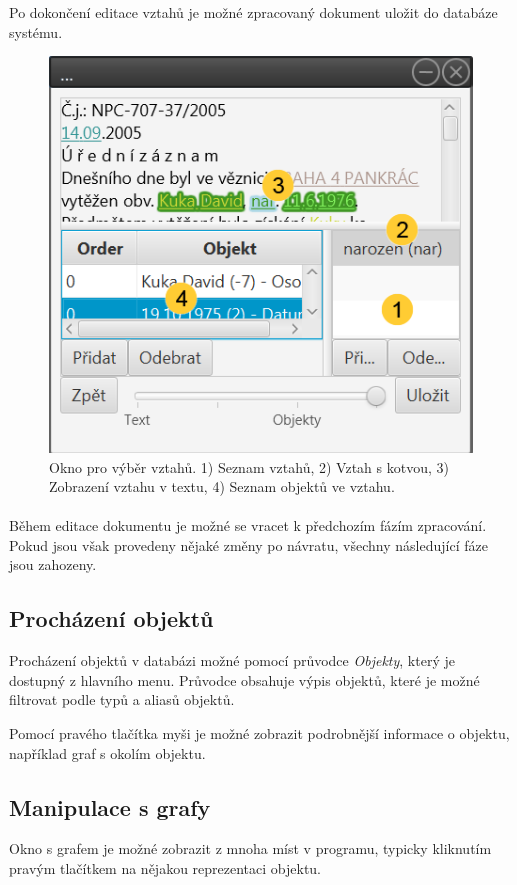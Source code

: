 \documentclass[12pt,a4paper]{report}
\begin{document}
Po dokončení editace vztahů je možné zpracovaný dokument uložit do databáze systému.

\begin{figure}[!htb]
	\centering
	\includegraphics[width=\textwidth]{vztahy}
	\caption{Okno pro výběr vztahů. 1) Seznam vztahů, 2) Vztah s kotvou, 3) Zobrazení vztahu v textu, 4) Seznam objektů ve vztahu.}	
	\label{fig:Vztahy}
\end{figure}

\paragraph{}
Během editace dokumentu je možné se vracet k předchozím fázím zpracování. Pokud jsou však provedeny nějaké změny po návratu, všechny následující fáze jsou zahozeny.

\subsection{Procházení objektů}
Procházení objektů v databázi možné pomocí průvodce \emph{Objekty}, který je dostupný z hlavního menu. Průvodce obsahuje výpis objektů, které je možné filtrovat podle typů a aliasů objektů.

Pomocí pravého tlačítka myši je možné zobrazit podrobnější informace o objektu, například graf s okolím objektu.

\subsection{Manipulace s grafy}
Okno s grafem je možné zobrazit z mnoha míst v programu, typicky kliknutím pravým tlačítkem na nějakou reprezentaci objektu.
\end{document}
